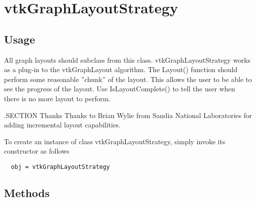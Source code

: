 \section{vtkGraphLayoutStrategy}

\subsection{Usage}

 All graph layouts should subclass from this class.  vtkGraphLayoutStrategy
 works as a plug-in to the vtkGraphLayout algorithm.  The Layout()
 function should perform some reasonable ''chunk'' of the layout.
 This allows the user to be able to see the progress of the layout.
 Use IsLayoutComplete() to tell the user when there is no more layout
 to perform.

 .SECTION Thanks
 Thanks to Brian Wylie from Sandia National Laboratories for adding incremental
 layout capabilities.

To create an instance of class vtkGraphLayoutStrategy, simply
invoke its constructor as follows
\begin{verbatim}
  obj = vtkGraphLayoutStrategy
\end{verbatim}
\subsection{Methods}

